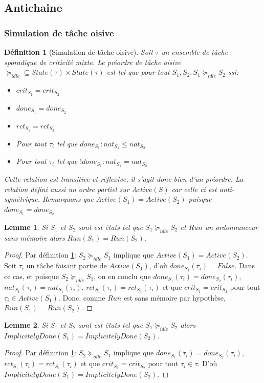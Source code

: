 \documentclass[a4paper]{report}
\theoremstyle{break}
\newtheorem{defin}{Définition}
\theoremstyle{breakplain}
\newtheorem{lem}{Lemme}
\begin{document}
\subsection{Antichaine}

\subsubsection{Simulation de tâche oisive}

\begin{defin}[Simulation de tâche oisive]
\label{idlesim}
Soit $\tau$ un ensemble de tâche sporadique de criticité mixte. Le préordre de tâche oisive $\succeq_{idle} \subseteq State(\tau)\times State(\tau)$ est tel que pour tout $S_1, S_2 : S_1 \succeq_{idle}S_2$ ssi:
\begin{itemize}
\item $crit_{S_1} = crit_{S_2}$
\item $done_{S_1} = done_{S_2}$
\item $rct_{S_1} = rct_{S_2}$
\item Pour tout $\tau_i$ tel que $done_{S_1} : nat_{S_1} \leq nat_{S_2}$
\item Pour tout $\tau_i$ tel que $!done_{S_1} : nat_{S_1} = nat_{S_2}$
\end{itemize}
Cette relation est transitive et réflexive, il s'agit donc bien d'un préordre. La relation défini aussi un ordre partiel sur $Active(S)$ car celle ci est anti-symétrique.
Remarquons que $Active(S_1) = Active (S_2)$ puisque $done_{S_1} = done_{S_2}$
\end{defin}

\begin{lem}
\label{runeq}
Si $S_1$ et $S_2$ sont est états tel que $S_1 \succeq_{idle}S_2$ et $Run$ un ordonnanceur sans mémoire alors $Run (S_1) = Run(S_2)$.
\end{lem}
\begin{proof} Par définition \ref{idlesim}: $S_2 \succeq_{idle} S_1$ implique que $Active(S_1) = Active(S_2)$. Soit $\tau_i$ un tâche faisant partie de $Active(S_1)$, d'où $done_{S_1}(\tau_i) = False$. Dans ce cas, et puisque $S_2 \succeq_{idle} S_1$, on en conclu que $done_{S_1}(\tau_i) = done_{S_2}(\tau_i)$, $nat_{S_1}(\tau_i) = nat_{S_1}(\tau_i)$, $rct_{S_1}(\tau_i) = rct_{S_1}(\tau_i)$ et que $crit_{S_1} = crit_{S_2}$ pour tout $\tau_i \in Active(S_1)$. Donc, comme $Run$ est sans mémoire par hypothèse, $Run(S_1) = Run(S_2)$.
\end{proof}

\begin{lem}
\label{impdoneeq}
Si $S_1$ et $S_2$ sont est états tel que $S_1 \succeq_{idle}S_2$ alors $ImplicitelyDone(S_1) = ImplicitelyDone(S_2)$.
\end{lem}
\begin{proof} Par définition \ref{idlesim}: $S_2 \succeq_{idle} S_1$ implique que $done_{S_1}(\tau_i) = done_{S_2}(\tau_i)$, $rct_{S_1}(\tau_i) = rct_{S_1}(\tau_i)$ et que $crit_{S_1} = crit_{S_2}$ pour tout $\tau_i \in \tau$. D'où $ImplicitelyDone(S_1) = ImplicitelyDone(S_2)$.
\end{proof}
\end{document}
